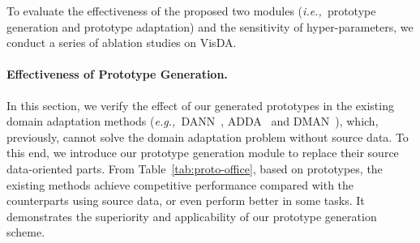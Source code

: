 \documentclass{article}
\def\ie{\emph{i.e.,~}}
\def\eg{\emph{e.g.,~}}
\begin{document}
To evaluate the effectiveness of the proposed two modules (\ie prototype generation and prototype adaptation) and the sensitivity of hyper-parameters, we conduct a series of ablation studies on VisDA.




\paragraph{Effectiveness of Prototype Generation.}

\begin{table}[t]
\setlength\tabcolsep{1pt}
    \begin{center}
    \end{center}
    \vspace{-0.1in}
    \caption{\label{tab:proto-office}Comparisons of the existing domain adaptation methods with source data or prototypes on \textbf{Office-31} (ResNet-50).}
\end{table}


In this section, we verify the effect of our generated prototypes in the existing domain adaptation methods (\eg DANN~\cite{ganin2015unsupervised}, ADDA~\cite{Tzeng2017AdversarialDD} and DMAN~\cite{zhang2019whole}), which, previously, cannot solve the domain adaptation problem without source data.
To this end, we introduce our prototype generation module to replace their source data-oriented parts. From Table~\ref{tab:proto-office},
based on prototypes, the existing methods achieve competitive performance compared with the counterparts using source data, or even perform better in some tasks. It demonstrates the superiority and applicability of our prototype generation scheme.
\end{document}
